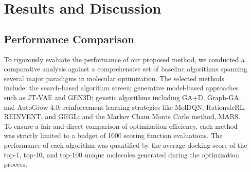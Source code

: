 \documentclass[lettersize,journal]{IEEEtran}
\begin{document}
\section{Results and Discussion}
\subsection{Performance Comparison}
To rigorously evaluate the performance of our proposed method, we conducted a comparative analysis against a comprehensive set of baseline algorithms spanning several major paradigms in molecular optimization. The selected methods include: the search-based algorithm screen; generative model-based approaches such as JT-VAE and GEN3D; genetic algorithms including GA+D, Graph-GA, and AutoGrow 4.0; reinforcement learning strategies like MolDQN, RationaleRL, REINVENT, and GEGL; and the Markov Chain Monte Carlo method, MARS. To ensure a fair and direct comparison of optimization efficiency, each method was strictly limited to a budget of 1000 scoring function evaluations. The performance of each algorithm was quantified by the average docking score of the top-1, top-10, and top-100 unique molecules generated during the optimization process.
\end{document}
